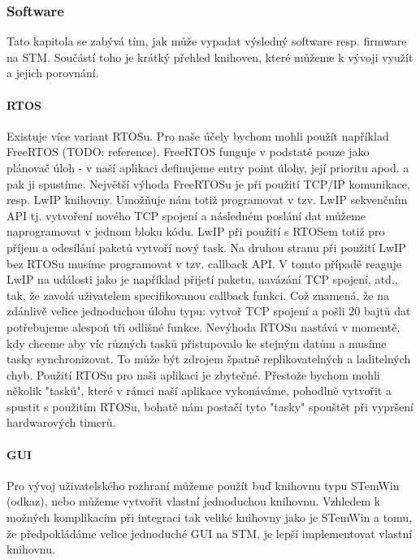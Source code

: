 \subsubsection{Software}
Tato kapitola se zabývá tím, jak může vypadat výsledný software resp. firmware na STM.
Součástí toho je krátký přehled knihoven, které můžeme k vývoji využít a jejich porovnání.

\paragraph{RTOS}
Existuje více variant RTOSu.
Pro naše účely bychom mohli použít například FreeRTOS (TODO: reference).
FreeRTOS funguje v podstatě pouze jako plánovač úloh - v naší aplikaci definujeme entry point
úlohy, její prioritu apod. a pak ji spustíme.
Největší výhoda FreeRTOSu je při použití TCP/IP komunikace, resp. LwIP knihovny.
Umožňuje nám totiž programovat v tzv. LwIP sekvenčním API tj. vytvoření nového TCP spojení
a následném poslání dat můžeme naprogramovat v jednom bloku kódu.
LwIP při použití s RTOSem totiž pro příjem a odesílání paketů vytvoří nový task.
Na druhou stranu při použití LwIP bez RTOSu musíme programovat v tzv. callback API.
V tomto případě reaguje LwIP na události jako je například přijetí paketu, navázání TCP spojení, atd.,
tak, že zavolá uživatelem specifikovanou callback funkci.
Což znamená, že na zdánlivě velice jednoduchou úlohu typu: vytvoř TCP spojení a pošli 20 bajtů dat
potřebujeme alespoň tři odlišné funkce.
Nevýhoda RTOSu nastává v momentě, kdy chceme aby víc různých tasků přistupovalo ke stejným datům
a musíme tasky synchronizovat.
To může být zdrojem špatně replikovatelných a laditelných chyb.
Použití RTOSu pro naši aplikaci je zbytečné.
Přestože bychom mohli několik "tasků", které v rámci naší aplikace vykonáváme, pohodlně vytvořit
a spustit s použitím RTOSu, bohatě nám postačí tyto "tasky" spouštět při vypršení hardwarových
timerů.



\paragraph{GUI}
Pro vývoj uživatelského rozhraní můžeme použít buď knihovnu typu STemWin (odkaz), nebo můžeme
vytvořit vlastní jednoduchou knihovnu.
Vzhledem k možných komplikacím při integraci tak veliké knihovny jako je STemWin a tomu, že
předpokládáme velice jednoduché GUI na STM, je lepší implementovat vlastní knihovnu.
